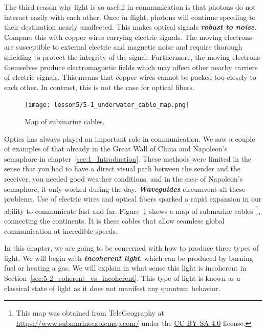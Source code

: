 The third reason why light is so useful in communication is that photons do not interact easily with each other.
Once in flight, photons will continue speeding to their destination nearly unaffected.
This makes optical signals \textit{\textbf{robust to noise}}.
Compare this with copper wires carrying electric signals.
The moving electrons are susceptible to external electric and magnetic noise and require thorough shielding to protect the integrity of the signal.
Furthermore, the moving electrons themselves produce electromagnetic fields which may affect other nearby carriers of electric signals.
This means that copper wires cannot be packed too closely to each other.
In contrast, this is not the case for optical fibers.

\begin{figure}[t]
    \centering
    \texttt{[image: lesson5/5-1\_underwater\_cable\_map.png]}
    \caption[Underwater cable map.]{Map of submarine cables.}
    \label{fig:5-1_underwater_cable_map}
\end{figure}

Optics has always played an important role in communication.
We saw a couple of examples of that already in the Great Wall of China and Napoleon's semaphore in chapter~\ref{sec:1_Introduction}.
These methods were limited in the sense that you had to have a direct visual path between the sender and the receiver, you needed good weather conditions, and in the case of Napoleon's semaphore, it only worked during the day.
\textit{\textbf{Waveguides}} circumvent all these problems.
Use of electric wires and optical fibers sparked a rapid expansion in our ability to communicate fast and far.
Figure~\ref{fig:5-1_underwater_cable_map} shows a map of submarine cables \footnote{This map was obtained from TeleGeography at \href{https://www.submarinecablemap.com/}{https://www.submarinecablemap.com/} under the \href{https://creativecommons.org/licenses/by-sa/4.0/}{CC BY-SA 4.0} license.}, connecting the continents.
It is these cables that allow seamless global communication at incredible speeds.

In this chapter, we are going to be concerned with how to produce three types of light.
We will begin with \textit{\textbf{incoherent light}}, which can be produced by burning fuel or heating a gas.
We will explain in what sense this light is incoherent in Section~\ref{sec:5-2_coherent_vs_incoherent}.
This type of light is known as a classical state of light as it does not manifest any quantum behavior.

